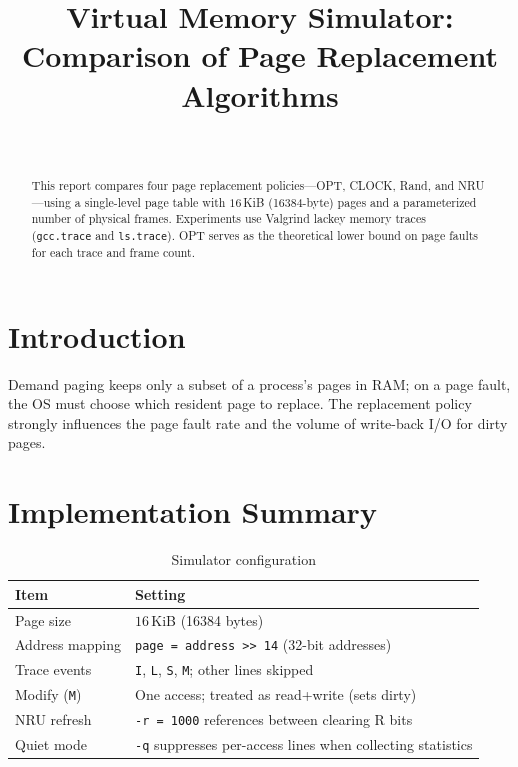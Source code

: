 \documentclass[11pt]{article}
\title{Virtual Memory Simulator:\\
       Comparison of Page Replacement Algorithms}
\author{\AuthorName \\ \CourseTerm}
\date{\ReportDate}
\begin{document}
\maketitle

\begin{abstract}
This report compares four page replacement policies---OPT, CLOCK, Rand, and NRU---using a single-level page table with $16$\,KiB (\num{16384}-byte) pages and a parameterized number of physical frames. Experiments use Valgrind lackey memory traces (\texttt{gcc.trace} and \texttt{ls.trace}). OPT serves as the theoretical lower bound on page faults for each trace and frame count.
\end{abstract}

\section{Introduction}

Demand paging keeps only a subset of a process's pages in RAM; on a page fault, the OS must choose which resident page to replace. The replacement policy strongly influences the page fault rate and the volume of write-back I/O for dirty pages.

\section{Implementation Summary}

\begin{table}[h]
  \centering
  \caption{Simulator configuration}
  \begin{tabular}{@{}ll@{}}
    \toprule
    Item & Setting \\
    \midrule
    Page size & $16$\,KiB (\num{16384} bytes) \\
    Address mapping & \texttt{page = address >> 14} (32-bit addresses) \\
    Trace events & \texttt{I}, \texttt{L}, \texttt{S}, \texttt{M}; other lines skipped \\
    Modify (\texttt{M}) & One access; treated as read+write (sets dirty) \\
    NRU refresh & \texttt{-r = 1000} references between clearing R bits \\
    Quiet mode & \texttt{-q} suppresses per-access lines when collecting statistics \\
    \bottomrule
  \end{tabular}
\end{table}
\end{document}
